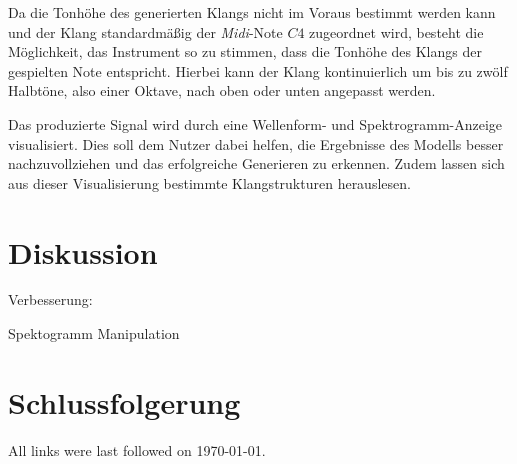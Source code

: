 \documentclass[
  a4paper,  %
  twoside,  %
  bibliography=totoc,
  headsepline,
  cleardoublepage=empty,
  parskip=half,
  draft=false
]{scrbook}
\begin{document}
Da die Tonhöhe des generierten Klangs nicht im Voraus bestimmt werden kann und der Klang standardmäßig der \emph{Midi}-Note $C4$ zugeordnet wird, besteht die Möglichkeit, das Instrument so zu stimmen, dass die Tonhöhe des Klangs der gespielten Note entspricht. Hierbei kann der Klang kontinuierlich um bis zu zwölf Halbtöne, also einer Oktave, nach oben oder unten angepasst werden.

Das produzierte Signal wird durch eine Wellenform- und Spektrogramm-Anzeige visualisiert. Dies soll dem Nutzer dabei helfen, die Ergebnisse des Modells besser nachzuvollziehen und das erfolgreiche Generieren zu erkennen. Zudem lassen sich aus dieser Visualisierung bestimmte Klangstrukturen herauslesen.




\chapter{Diskussion}

Verbesserung:

Spektogramm Manipulation 

\chapter{Schlussfolgerung}
\label{sec:conclusion}


\printbibliography

All links were last followed on \today{}.

\appendix
%

\pagestyle{empty}
\renewcommand*{\chapterpagestyle}{empty}
\Affirmation
\end{document}
